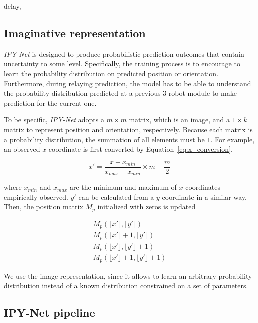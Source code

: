 \documentclass[letterpaper, 10 pt, conference]{ieeeconf}  %
\begin{document}
	delay, 


	\subsection{Imaginative representation} 
	\label{sec:imaginative_representation}
	
	\emph{IPY-Net} is designed to produce probabilistic prediction outcomes that contain 
	uncertainty to some level. Specifically, the training process is to encourage to learn 
	the probability distribution on predicted position or orientation. 
	Furthermore, during relaying prediction, the model has to be able to understand 
	the probability distribution predicted at a previous $3$-robot module to 
	make prediction for the current one.  
	
	To be specific, \emph{IPY-Net} adopts a $m \times m$ matrix, which is an image, and 
	a $1 \times k$ matrix to represent position and orientation, respectively. Because  
	each matrix is a probability distribution, the summation of all elements must be $1$. 
	For example, an observed $x$ coordinate is first converted by Equation~\ref{eq:x_conversion}.
	
	\begin{equation}
	\label{eq:x_conversion}
		x' = \frac{x - x_{min}}{x_{max} - x_{min}} \times m - \frac{m}{2}
	\end{equation}
	
	where $x_{min}$ and $x_{max}$ are the minimum and maximum of $x$ coordinates
	empirically observed. $y'$ can be calculated from a $y$ coordinate in a similar way. 
	Then, the position matrix $M_p$ initialized with zeros is updated 
	
	\begin{equation}
		\begin{aligned}
		M_{p}(\lfloor{x'}\rfloor, \lfloor{y'}\rfloor) \\
		M_{p}(\lfloor{x'}\rfloor+1, \lfloor{y'}\rfloor) \\
		M_{p}(\lfloor{x'}\rfloor, \lfloor{y'}\rfloor+1) \\
		M_{p}(\lfloor{x'}\rfloor+1, \lfloor{y'}\rfloor+1) 
		\end{aligned}
	\end{equation} 
	
	We use the image representation, since it allows to learn an arbitrary probability distribution 
	instead of a known distribution constrained on a set of parameters.
	
	
	\subsection{IPY-Net pipeline}
	\label{sec:ipy-net_pipeline}
	 
\end{document}
